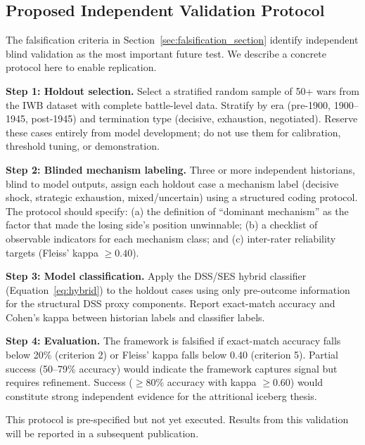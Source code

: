 \subsection{Proposed Independent Validation Protocol}\label{sec:validation_protocol}

The falsification criteria in Section~\ref{sec:falsification_section} identify independent blind validation as the most important future test. We describe a concrete protocol here to enable replication.

\textbf{Step 1: Holdout selection.} Select a stratified random sample of 50+ wars from the IWB dataset with complete battle-level data. Stratify by era (pre-1900, 1900--1945, post-1945) and termination type (decisive, exhaustion, negotiated). Reserve these cases entirely from model development; do not use them for calibration, threshold tuning, or demonstration.

\textbf{Step 2: Blinded mechanism labeling.} Three or more independent historians, blind to model outputs, assign each holdout case a mechanism label (decisive shock, strategic exhaustion, mixed/uncertain) using a structured coding protocol. The protocol should specify: (a) the definition of ``dominant mechanism'' as the factor that made the losing side's position unwinnable; (b) a checklist of observable indicators for each mechanism class; and (c) inter-rater reliability targets (Fleiss' kappa $\geq 0.40$).

\textbf{Step 3: Model classification.} Apply the DSS/SES hybrid classifier (Equation~\ref{eq:hybrid}) to the holdout cases using only pre-outcome information for the structural DSS proxy components. Report exact-match accuracy and Cohen's kappa between historian labels and classifier labels.

\textbf{Step 4: Evaluation.} The framework is falsified if exact-match accuracy falls below 20\% (criterion 2) or Fleiss' kappa falls below 0.40 (criterion 5). Partial success (50--79\% accuracy) would indicate the framework captures signal but requires refinement. Success ($\geq$80\% accuracy with kappa $\geq$0.60) would constitute strong independent evidence for the attritional iceberg thesis.

This protocol is pre-specified but not yet executed. Results from this validation will be reported in a subsequent publication.
